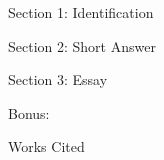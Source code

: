 \documentclass[12pt,a4paper]{article}
\begin{document}
    
    \begin{center}
        Section 1: Identification
    \end{center}
    

    \begin{center}
        Section 2: Short Answer
    \end{center}
    

    \begin{center}
        Section 3: Essay
    \end{center}
    

    \begin{center}
        Bonus:
    \end{center}
    
    \newpage
    \begin{center}
        Works Cited
    \end{center}
    \printbibliography[heading=none]
\end{document}
